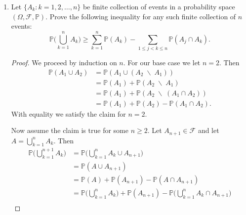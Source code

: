 \documentclass[12pt]{article}
\newenvironment{solution}
{\renewcommand\qedsymbol{$\blacksquare$}\begin{proof}[Solution]}
{\end{proof}}
\begin{document}
\begin{enumerate}
\begin{solution}
                an element of $\mathcal{F}_1\cup\mathcal{F}_2$. Thus it is not
                true that $\mathcal{F}_1\cup\mathcal{F}_2$ is closed under
                unions. Therefore, it is not a $\sigma$-algebra. 
            \end{solution}
        \item Let $\{A_k:k=1, 2, \dots, n\}$ be finite collection of events in
            a probability space $(\Omega, \mathcal{F}, \mathbb{P})$. Prove the
            following inequality for any such finite collection of $n$ events:
            \begin{equation*}
                \mathbb{P}\big(\bigcup_{k=1}^nA_k\big)\geq\sum_{k=1}^n\mathbb{P}(A_k)-\sum_{1\leq
                j<k\leq n}\mathbb{P}(A_j\cap A_k).
            \end{equation*}
            \begin{proof}
                We proceed by induction on $n$. For our base case we let $n=2$.
                Then 
                \begin{align*}
                    \mathbb{P}(A_1\cup A_2) &= \mathbb{P}(A_1\cup(A_2\;\backslash
                    \;A_1)) \\
                    &=\mathbb{P}(A_1)+\mathbb{P}(A_2\;\backslash\; A_1) \\
                    &=\mathbb{P}(A_1)+\mathbb{P}(A_2\;\backslash\;(A_1\cap
                    A_2)) \\
                    &=\mathbb{P}(A_1)+\mathbb{P}(A_2)-\mathbb{P}(A_1\cap A_2).
                \end{align*}
                With equality we satisfy the claim for $n=2$.\par\hspace{4mm}
                Now assume the claim is true for some $n\geq 2$. Let
                $A_{n+1}\in\mathcal{F}$ and let $A=\bigcup_{k=1}^{n} A_k$. Then 
                \begin{align*}
                    \mathbb{P}\big(\bigcup_{k=1}^{n+1}A_k\big)&=
                    \mathbb{P}\big(\bigcup_{k=1}^{n}A_k\cup A_{n+1}\big) \\
                    &=\mathbb{P}(A\cup A_{n+1}) \\
                    &= \mathbb{P}(A)+\mathbb{P}(A_{n+1})-\mathbb{P}(A\cap
                    A_{n+1}) \\
                    &= \mathbb{P}\big(\bigcup_{k=1}^n
                    A_k\big)+\mathbb{P}(A_{n+1})-\mathbb{P}\big(\bigcup_{k=1}^{n}A_k\cap
                    A_{n+1}\big) \\

\end{align*}
\end{proof}
\end{enumerate}
\end{document}
